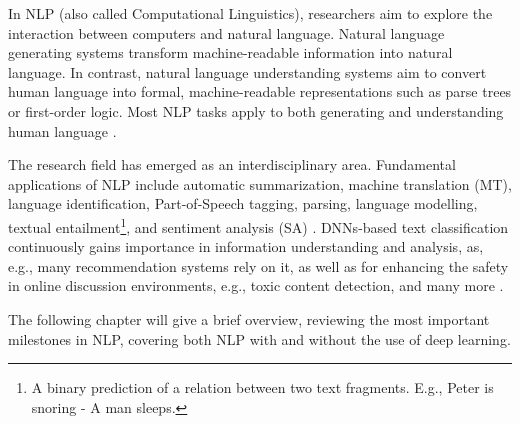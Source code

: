 In NLP (also called Computational Linguistics), researchers aim to explore the interaction between computers and natural language. Natural language generating systems transform machine-readable information into natural language. In contrast, natural language understanding systems aim to convert human language into formal, machine-readable representations such as parse trees or first-order logic. Most NLP tasks apply to both generating and understanding human language \cite{kumar2011natural}.

The research field has emerged as an interdisciplinary area. Fundamental applications of NLP include automatic summarization, machine translation (MT), language identification, Part-of-Speech tagging, parsing, language modelling, textual entailment\footnote{A binary prediction of a relation between two text fragments. E.g., Peter is snoring - A man sleeps.}, and sentiment analysis (SA) \cite{mani2001automatic, dostert1955georgetown, tang2017phonetic,  schmid1994part, bengio2003neural, socher2013recursive,dagan2005pascal, prabowo2009sentiment}. DNNs-based text classification continuously gains importance in information understanding and analysis, as, e.g., many recommendation systems rely on it, as well as for enhancing the safety in online discussion environments, e.g., toxic content detection, and many more \cite{kumar2011natural}. 



The following chapter will give a brief overview, reviewing the most important milestones in NLP, covering both NLP with and without the use of deep learning.

